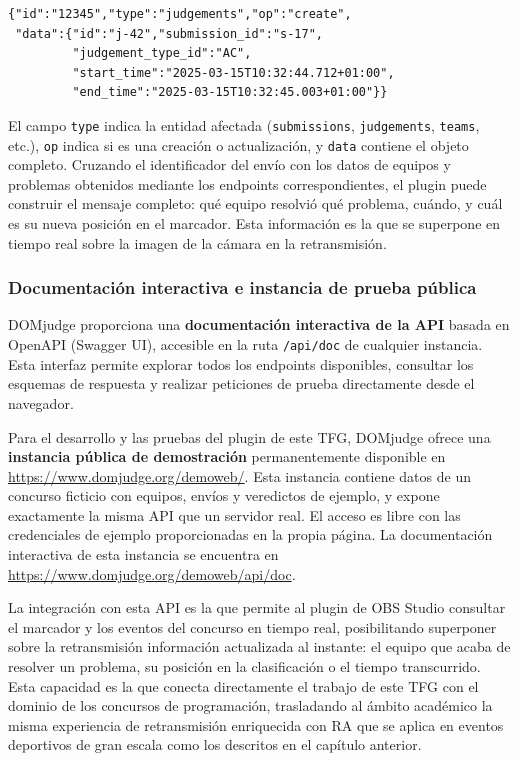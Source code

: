\begin{verbatim}
{"id":"12345","type":"judgements","op":"create",
 "data":{"id":"j-42","submission_id":"s-17",
         "judgement_type_id":"AC",
         "start_time":"2025-03-15T10:32:44.712+01:00",
         "end_time":"2025-03-15T10:32:45.003+01:00"}}
\end{verbatim}

El campo \texttt{type} indica la entidad afectada (\texttt{submissions}, \texttt{judgements}, \texttt{teams}, etc.), \texttt{op} indica si es una creación o actualización, y \texttt{data} contiene el objeto completo. Cruzando el identificador del envío con los datos de equipos y problemas obtenidos mediante los endpoints correspondientes, el plugin puede construir el mensaje completo: qué equipo resolvió qué problema, cuándo, y cuál es su nueva posición en el marcador. Esta información es la que se superpone en tiempo real sobre la imagen de la cámara en la retransmisión.

\subsubsection*{Documentación interactiva e instancia de prueba pública}

DOMjudge proporciona una \textbf{documentación interactiva de la API} basada en OpenAPI (Swagger UI), accesible en la ruta \texttt{/api/doc} de cualquier instancia. Esta interfaz permite explorar todos los endpoints disponibles, consultar los esquemas de respuesta y realizar peticiones de prueba directamente desde el navegador.

Para el desarrollo y las pruebas del plugin de este TFG, DOMjudge ofrece una \textbf{instancia pública de demostración} permanentemente disponible en \url{https://www.domjudge.org/demoweb/}. Esta instancia contiene datos de un concurso ficticio con equipos, envíos y veredictos de ejemplo, y expone exactamente la misma API que un servidor real. El acceso es libre con las credenciales de ejemplo proporcionadas en la propia página. La documentación interactiva de esta instancia se encuentra en \url{https://www.domjudge.org/demoweb/api/doc}.

La integración con esta API es la que permite al plugin de OBS Studio consultar el marcador y los eventos del concurso en tiempo real, posibilitando superponer sobre la retransmisión información actualizada al instante: el equipo que acaba de resolver un problema, su posición en la clasificación o el tiempo transcurrido. Esta capacidad es la que conecta directamente el trabajo de este TFG con el dominio de los concursos de programación, trasladando al ámbito académico la misma experiencia de retransmisión enriquecida con RA que se aplica en eventos deportivos de gran escala como los descritos en el capítulo anterior.
